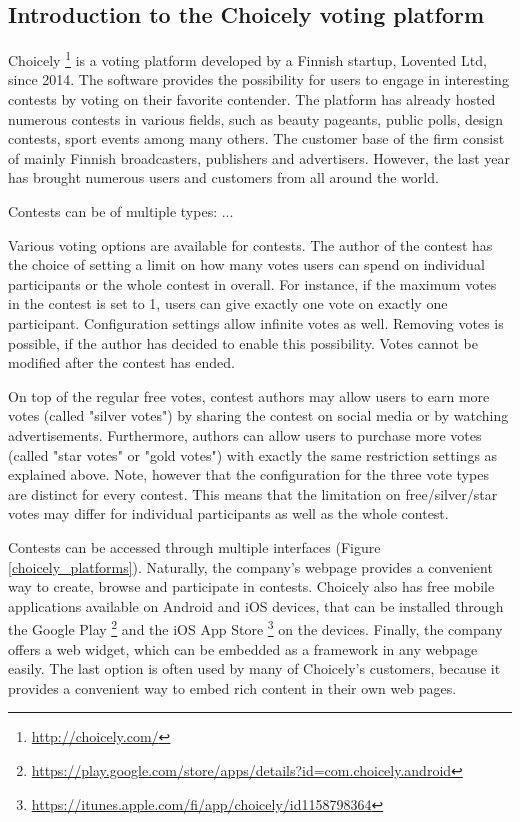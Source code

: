 \subsection{Introduction to the Choicely voting platform}
    Choicely \footnote{\url{http://choicely.com/}} is a voting platform developed by a Finnish startup, Lovented Ltd, since 2014. The software provides the possibility for users to engage in interesting contests by voting on their favorite contender. The platform has already hosted numerous contests in various fields, such as beauty pageants, public polls, design contests, sport events among many others. The customer base of the firm consist of mainly Finnish broadcasters, publishers and advertisers. However, the last year has brought numerous users and customers from all around the world.
    
    Contests can be of multiple types: ... %
    
    Various voting options are available for contests. The author of the contest has the choice of setting a limit on how many votes users can spend on individual participants or the whole contest in overall. For instance, if the maximum votes in the contest is set to 1, users can give exactly one vote on exactly one participant. Configuration settings allow infinite votes as well. Removing votes is possible, if the author has decided to enable this possibility. Votes cannot be modified after the contest has ended.
    
    On top of the regular free votes, contest authors may allow users to earn more votes (called "silver votes") by sharing the contest on social media or by watching advertisements. Furthermore, authors can allow users to purchase more votes (called "star votes" or "gold votes") with exactly the same restriction settings as explained above. Note, however that the configuration for the three vote types are distinct for every contest. This means that the limitation on free/silver/star votes may differ for individual participants as well as the whole contest. 

    Contests can be accessed through multiple interfaces (Figure \ref{choicely_platforms}). Naturally, the company's webpage provides a convenient way to create, browse and participate in contests. Choicely also has free mobile applications available on Android and iOS devices, that can be installed through the Google Play \footnote{\url{https://play.google.com/store/apps/details?id=com.choicely.android}} and the iOS App Store \footnote{\url{https://itunes.apple.com/fi/app/choicely/id1158798364}} on the devices. Finally, the company offers a web widget, which can be embedded as a framework in any webpage easily. The last option is often used by many of Choicely's customers, because it provides a convenient way to embed rich content in their own web pages.
    
